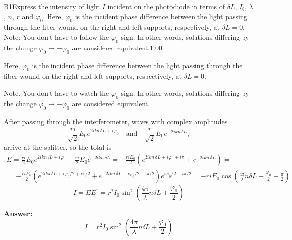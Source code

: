 \documentclass[11pt,a4paper]{article}
\begin{document}
\begin{solcard}{B1}{Express the intensity of light $I$ incident on the photodiode in terms of $\delta L$, $I_0$, $\lambda$, $n$, $r$ and $\varphi_0$. Here, $\varphi_0$ is the incident phase difference between the light passing through the fiber wound on the right and left supports, respectively, at $\delta L=0$. Note: You don't have to follow the $\varphi_0$ sign. In other words, solutions differing by the change $\varphi_0 \to -\varphi_0$ are considered equivalent.}{1.00}

Here, $\varphi_0$ is the incident phase difference between the light passing through the fiber wound on the right and left supports, respectively, at $\delta L=0$.


Note. You don't have to watch the $\varphi_0$ sign. In other words, solutions differing by the change $\varphi_0 \to -\varphi_0$ are considered equivalent.


After passing through the interferometer, waves with complex amplitudes \[\frac{ri}{\sqrt{2}} E_0 e^{2ikn \, \delta L + i \varphi_0}\quad\text{and} \quad \frac{r}{\sqrt{2}} E_0 e^{-2ikn \, \delta L},\] arrive at the splitter, so the total is \[ \begin{split} E = \frac{ri}{2} E_0e^{2ikn \, \delta L + i \varphi_0} - \frac{ri}{2}E_0 e^{-2ikn \, \delta L} = -\frac{riE_0}{2}\left( e^{2 i k n \, \delta L+ i \varphi_0 + i \pi} + e^{-2ikn \, \delta L}\right) = \\ =  -\frac{riE_0}{2}\left( e^{2 i k n \, \delta L+ i \varphi_0/2 + i \pi/2} + e^{-2ikn \, \delta L - i \varphi_0/2 - i \pi/2}\right) e^{i \varphi_0/2 + i \pi/2} = -ri E_0 \cos\left(  \frac{4 \pi}{\lambda}n \delta L + \frac{\varphi_0}{2} + \frac{\pi}{2} \right) \end{split} \] \[I = EE^* = r^2 I_0 \sin^2 \left( \frac{4 \pi}{\lambda} n \delta L + \frac{\varphi_0}{2} \right)\]

\par\smallskip\noindent\textbf{Answer:} \[I = r^2 I_0 \sin^2 \left( \frac{4 \pi}{\lambda} n \delta L + \frac{\varphi_0}{2} \right)\]
\end{solcard}
\end{document}

